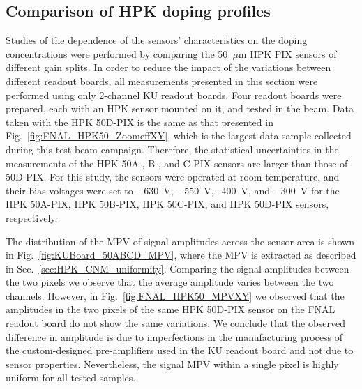 \documentclass[preprint,1p]{elsarticle}
\begin{document}
\subsection{Comparison of HPK doping profiles}

Studies of the dependence of the sensors' characteristics on the doping
concentrations were performed by comparing the 50~$\mu$m HPK PIX sensors of
different gain splits. In order to reduce the impact of the variations between
different readout boards, all measurements presented in this section were
performed using only 2-channel KU readout boards. Four readout boards were
prepared, each with an HPK sensor mounted on it, and tested in the beam. Data
taken with the HPK 50D-PIX is the same as that presented in
Fig.~\ref{fig:FNAL_HPK50_ZoomeffXY}, which is the largest data sample collected
during this test beam campaign. Therefore, the statistical uncertainties in the
measurements of the HPK 50A-, B-, and C-PIX sensors are larger than those of
50D-PIX. For this study, the sensors were operated at room temperature, and 
their bias voltages were set to $-630$~V, $-550$~V,$-400$~V, and $-300$~V
for the HPK 50A-PIX, HPK 50B-PIX, HPK 50C-PIX, and HPK 50D-PIX sensors, respectively.


The distribution of the MPV of signal amplitudes across the sensor area is shown in
Fig.~\ref{fig:KUBoard_50ABCD_MPV}, where the MPV is extracted as described in
Sec.~\ref{sec:HPK_CNM_uniformity}. Comparing the signal amplitudes between the
two pixels we observe that the average amplitude varies between the two channels. 
However, in Fig.~\ref{fig:FNAL_HPK50_MPVXY} we observed that the amplitudes in the
two pixels of the same HPK 50D-PIX sensor on the FNAL readout board do not show
the same variations. We conclude that the observed difference in amplitude
is due to imperfections in the manufacturing process of the custom-designed
pre-amplifiers used in the KU readout board and not due to
sensor properties. Nevertheless, the signal MPV within a
single pixel is highly uniform for all tested samples. 
\end{document}
